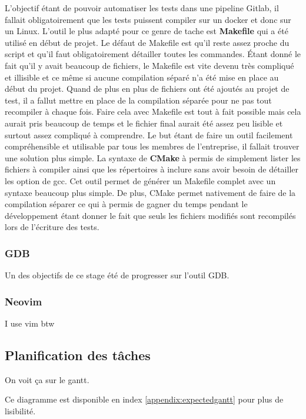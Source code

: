 \documentclass[a4paper]{article}
\begin{document}
L'objectif étant de pouvoir automatiser les tests dans une pipeline Gitlab, il
fallait obligatoirement que les tests puissent compiler sur un docker et donc
sur un Linux. L'outil le plus adapté pour ce genre de tache est
\textbf{Makefile} qui a été utilisé en début de projet. Le défaut de Makefile
est qu'il reste assez proche du script et qu'il faut obligatoirement détailler
toutes les commandes. Étant donné le fait qu'il y avait beaucoup de fichiers, le
Makefile est vite devenu très compliqué et illisible et ce même si aucune
compilation séparé n'a été mise en place au début du projet. Quand de plus en
plus de fichiers ont été ajoutés au projet de test, il a fallut mettre en place
de la compilation séparée pour ne pas tout recompiler à chaque fois. Faire cela
avec Makefile est tout à fait possible mais cela aurait pris beaucoup de temps     %
et le fichier final aurait été assez peu lisible et surtout assez compliqué à
comprendre. Le but étant de faire un outil facilement compréhensible et
utilisable par tous les membres de l'entreprise, il fallait trouver une solution
plus simple. La syntaxe de \textbf{CMake} à permis de simplement lister les
fichiers à compiler ainsi que les répertoires à inclure sans avoir besoin de
détailler les option de gcc. Cet outil permet de générer un Makefile complet
avec un syntaxe beaucoup plus simple. De plus, CMake permet nativement de faire
de la compilation séparer ce qui à permis de gagner du temps pendant le
développement étant donner le fait que seuls les fichiers modifiés sont
recompilés lors de l'écriture des tests.

\subsubsection{GDB}

Un des objectifs de ce stage été de progresser sur l'outil GDB.

\subsubsection{Neovim}

I use vim btw

\subsection{Planification des tâches}

On voit ça sur le gantt.

Ce diagramme est disponible en index \ref{appendix:expectedgantt} pour
plus de lisibilité.
\end{document}
